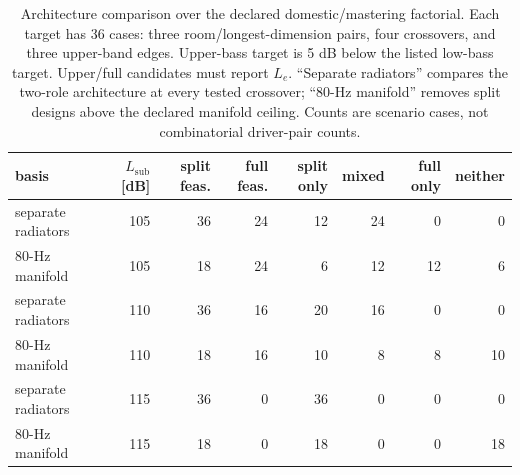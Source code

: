 \begin{table}[htbp]
\centering
\caption{Architecture comparison over the declared domestic/mastering factorial. Each target has 36 cases: three room/longest-dimension pairs, four crossovers, and three upper-band edges. Upper-bass target is 5 dB below the listed low-bass target. Upper/full candidates must report $L_e$. ``Separate radiators'' compares the two-role architecture at every tested crossover; ``80-Hz manifold'' removes split designs above the declared manifold ceiling. Counts are scenario cases, not combinatorial driver-pair counts.}
\label{tab:architecture-comparison}
\scriptsize
\setlength{\tabcolsep}{3pt}
\begin{tabular}{lrrrrrrr}
\toprule
basis & $L_{\mathrm{sub}}$ [dB] & split feas. & full feas. & split only & mixed & full only & neither\\
\midrule
separate radiators & 105 & 36 & 24 & 12 & 24 & 0 & 0\\
80-Hz manifold & 105 & 18 & 24 & 6 & 12 & 12 & 6\\
separate radiators & 110 & 36 & 16 & 20 & 16 & 0 & 0\\
80-Hz manifold & 110 & 18 & 16 & 10 & 8 & 8 & 10\\
separate radiators & 115 & 36 & 0 & 36 & 0 & 0 & 0\\
80-Hz manifold & 115 & 18 & 0 & 18 & 0 & 0 & 18\\
\bottomrule
\end{tabular}
\end{table}
